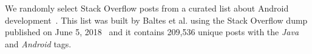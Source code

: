 We randomly select  Stack Overflow posts from a curated list about Android development~\cite{baltes2020}.
This list was built by Baltes et al. 
using the Stack Overflow dump published on June 5, 2018~\cite{baltes2019-rep, SOTorrent2019}
and it contains 209,536 unique posts with the \textit{Java} and \textit{Android} tags.




